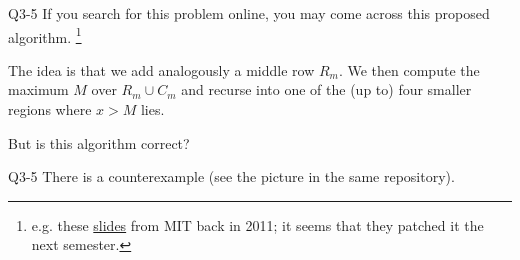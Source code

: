 \documentclass{scratcl}
\begin{document}
\begin{frame}{Q3-5}
  If you search for this problem online, you may come across this proposed algorithm. \footnote{e.g. these  \href{https://courses.csail.mit.edu/6.006/spring11/lectures/lec02.pdf}{slides} from MIT back in 2011; it seems that they patched it the next semester. }
  \par The idea is that we add analogously a middle row $R_m$. We then compute the maximum $M$ over $R_m \cup C_m$ and recurse into one of the (up to) four smaller regions where $x>M$ lies. 
  \begin{center}
  \end{center}
  But is this algorithm correct? 
\end{frame}
\begin{frame}{Q3-5}
  There is a counterexample (see the picture in the same repository). 
\end{frame}
\iffalse
\end{document}
